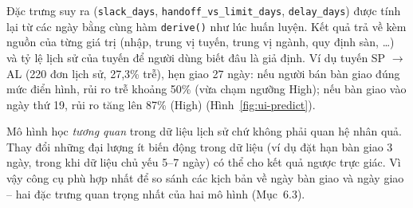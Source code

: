 
Đặc trưng suy ra (\texttt{slack\_days}, \texttt{handoff\_vs\_limit\_days},
\texttt{delay\_days}) được tính lại từ các ngày bằng cùng hàm \texttt{derive()} như lúc huấn
luyện. Kết quả trả về kèm nguồn của từng giá trị (nhập, trung vị tuyến, trung vị ngành, quy định
sàn, \ldots) và tỷ lệ lịch sử của tuyến để người dùng biết đâu là giả định. 
Ví dụ tuyến
SP $\to$ AL (220 đơn lịch sử, 27,3\% trễ), hẹn giao 27 ngày: nếu người bán bàn giao đúng mức
điển hình, rủi ro trễ khoảng 50\% (vừa chạm ngưỡng High); nếu bàn giao vào ngày thứ 19, rủi ro tăng
lên 87\% (High) (Hình~\ref{fig:ui-predict}).

Mô hình học \textit{tương quan} trong dữ liệu lịch sử chứ không phải quan hệ nhân quả.
Thay đổi những đại lượng ít biến động trong dữ liệu (ví dụ đặt hạn bàn giao 3 ngày, trong khi
dữ liệu chủ yếu 5--7 ngày) có thể cho kết quả ngược trực giác. Vì vậy công cụ phù hợp nhất để so
sánh các kịch bản về ngày bàn giao và ngày giao -- hai đặc trưng quan trọng nhất của hai mô hình
(Mục~6.3).

